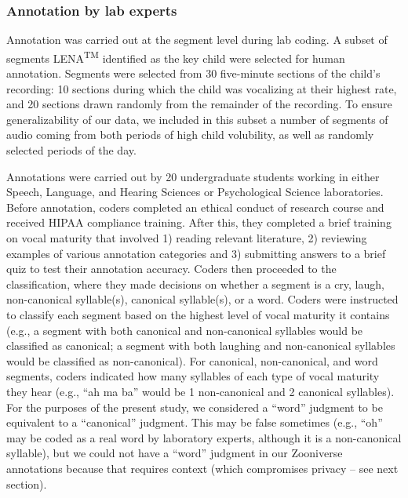 \documentclass[english,,man]{apa6}
\begin{document}
\hypertarget{annotation-by-lab-experts}{%
\subsubsection{Annotation by lab experts}\label{annotation-by-lab-experts}}

Annotation was carried out at the segment level during lab coding. A subset of segments LENA\textsuperscript{TM} identified as the key child were selected for human annotation. Segments were selected from 30 five-minute sections of the child's recording: 10 sections during which the child was vocalizing at their highest rate, and 20 sections drawn randomly from the remainder of the recording. To ensure generalizability of our data, we included in this subset a number of segments of audio coming from both periods of high child volubility, as well as randomly selected periods of the day.

Annotations were carried out by 20 undergraduate students working in either Speech, Language, and Hearing Sciences or Psychological Science laboratories. Before annotation, coders completed an ethical conduct of research course and received HIPAA compliance training. After this, they completed a brief training on vocal maturity that involved 1) reading relevant literature, 2) reviewing examples of various annotation categories and 3) submitting answers to a brief quiz to test their annotation accuracy. Coders then proceeded to the classification, where they made decisions on whether a segment is a cry, laugh, non-canonical syllable(s), canonical syllable(s), or a word. Coders were instructed to classify each segment based on the highest level of vocal maturity it contains (e.g., a segment with both canonical and non-canonical syllables would be classified as canonical; a segment with both laughing and non-canonical syllables would be classified as non-canonical). For canonical, non-canonical, and word segments, coders indicated how many syllables of each type of vocal maturity they hear (e.g., \enquote{ah ma ba} would be 1 non-canonical and 2 canonical syllables). For the purposes of the present study, we considered a \enquote{word} judgment to be equivalent to a \enquote{canonical} judgment. This may be false sometimes (e.g., \enquote{oh} may be coded as a real word by laboratory experts, although it is a non-canonical syllable), but we could not have a \enquote{word} judgment in our Zooniverse annotations because that requires context (which compromises privacy -- see next section).
\end{document}
